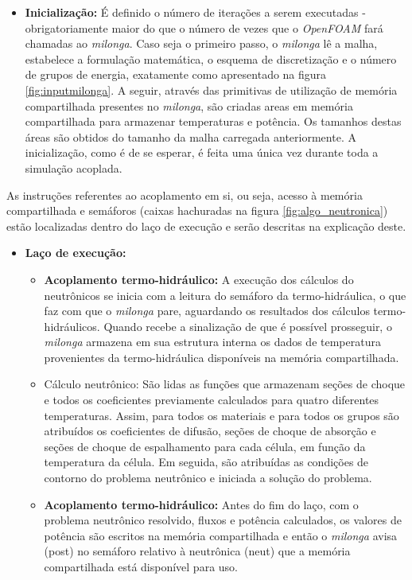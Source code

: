 \begin{itemize}
\item \textbf{Inicialização:} É definido o número de iterações a serem executadas - obrigatoriamente maior do que o número
  de vezes que o \textit{OpenFOAM} fará chamadas ao \textit{milonga}. Caso seja o primeiro passo, o \textit{milonga}
  lê a malha, estabelece a formulação matemática, o esquema de discretização e o número de grupos de energia, exatamente
  como apresentado na figura \ref{fig:inputmilonga}. A seguir, através das primitivas de utilização de memória compartilhada
  presentes no \textit{milonga}, são criadas areas em memória compartilhada para armazenar temperaturas e potência. Os tamanhos
  destas áreas são obtidos do tamanho da malha carregada anteriormente. A inicialização, como é de se esperar, é feita uma única
  vez durante toda a simulação acoplada.
\end{itemize}

As instruções referentes ao acoplamento em si, ou seja, acesso à memória compartilhada e semáforos
(caixas hachuradas na figura \ref{fig:algo_neutronica}) estão localizadas dentro do laço de execução e serão
descritas na explicação deste.

\begin{itemize}
\item \textbf{Laço de execução:}

\begin{itemize}
\item \textbf{Acoplamento termo-hidráulico:} A execução dos cálculos do neutrônicos se inicia com a leitura do semáforo da
  termo-hidráulica, o que faz com que o \textit{milonga} pare, aguardando os resultados dos cálculos termo-hidráulicos.
  Quando recebe a sinalização de que é possível prosseguir, o \textit{milonga} armazena em sua estrutura interna os dados
  de temperatura provenientes da termo-hidráulica disponíveis na memória compartilhada.
\item Cálculo neutrônico: São lidas as funções que armazenam seções de choque e todos os coeficientes previamente calculados para quatro
  diferentes temperaturas. Assim, para todos os materiais e para todos os grupos são atribuídos os coeficientes de difusão,
  seções de choque de absorção e seções de choque de espalhamento para cada célula, em função da temperatura da célula.
  Em seguida, são atribuídas as condições de contorno do problema neutrônico e iniciada a solução do problema.
\item \textbf{Acoplamento termo-hidráulico:} Antes do fim do laço, com o problema neutrônico resolvido, fluxos e potência
  calculados, os valores de potência são escritos na memória compartilhada e então o \textit{milonga} avisa (post) no
  semáforo relativo à neutrônica (neut) que a memória compartilhada está disponível para uso.

\end{itemize}
\end{itemize}

